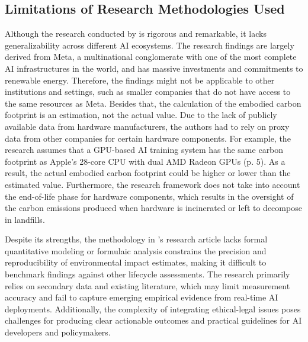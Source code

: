 \documentclass[a4paper, 12pt]{article}
\begin{document}
\subsection{Limitations of Research Methodologies Used}
\hspace{24pt}Although the research conducted by \citet{Wu2022} is rigorous and remarkable, it lacks generalizability across different AI ecosystems. The research findings are largely derived from Meta, a multinational conglomerate with one of the most complete AI infrastructures in the world, and has massive investments and commitments to renewable energy. Therefore, the findings might not be applicable to other institutions and settings, such as smaller companies that do not have access to the same resources as Meta. Besides that, the calculation of the embodied carbon footprint is an estimation, not the actual value. Due to the lack of publicly available data from hardware manufacturers, the authors had to rely on proxy data from other companies for certain hardware components. For example, the research assumes that a GPU-based AI training system has the same carbon footprint as Apple's 28-core CPU with dual AMD Radeon GPUs (p. 5). As a result, the actual embodied carbon footprint could be higher or lower than the estimated value. Furthermore, the research framework does not take into account the end-of-life phase for hardware components, which results in the oversight of the carbon emissions produced when hardware is incinerated or left to decompose in landfills.

\hspace{24pt} Despite its strengths, the methodology in \citet{Zhuk2023}'s research article lacks formal quantitative modeling or formulaic analysis constrains the precision and reproducibility of environmental impact estimates, making it difficult to benchmark findings against other lifecycle assessments. The research primarily relies on secondary data and existing literature, which may limit measurement accuracy and fail to capture emerging empirical evidence from real-time AI deployments. Additionally, the complexity of integrating ethical-legal issues poses challenges for producing clear actionable outcomes and practical guidelines for AI developers and policymakers.
\end{document}
